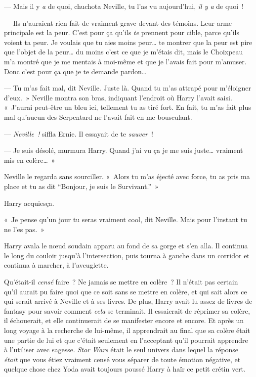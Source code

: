 --- Mais il y \emph{a} de quoi, chuchota Neville, tu l'as vu aujourd'hui, \emph{il y a} de quoi~!

--- Ils n'auraient rien fait de vraiment grave devant des témoins.
Leur arme principale est la peur.
C'est pour ça qu'ils \emph{te} prennent pour cible, parce qu'ils voient ta peur.
Je voulais que tu aies moins peur… te montrer que la peur est pire que l'objet de la peur… du moins c'est ce que je m'étais dit, mais le Choixpeau m'a montré que je me mentais à moi-même et que je l'avais fait pour m'amuser.
Donc c'est pour ça que je te demande pardon…

--- Tu m'as fait mal, dit Neville. Juste là.
Quand tu m'as attrapé pour m'éloigner d'eux.~»
Neville montra son bras, indiquant l'endroit où Harry l'avait saisi.
«~J'aurai peut-être un bleu ici, tellement tu as tiré fort.
En fait, tu m'as fait plus mal qu'aucun des Serpentard ne l'avait fait en me bousculant.

--- \emph{Neville~!} siffla Ernie. Il essayait de te \emph{sauver}~!

--- Je suis désolé, murmura Harry. Quand j'ai vu ça je me suis juste… vraiment mis en colère…~»

Neville le regarda sans sourciller.
«~Alors tu m'as éjecté avec force, tu as pris ma place et tu as dit “Bonjour, je suis le Survivant.”~»

Harry acquiesça.

«~Je pense qu'un jour tu seras vraiment cool, dit Neville. Mais pour l'instant tu ne l'es pas.~»

Harry avala le nœud soudain apparu au fond de sa gorge et s'en alla.
Il continua le long du couloir jusqu'à l'intersection, puis tourna à gauche dans un corridor et continua à marcher, à l'aveuglette.

Qu'était-il \emph{censé} faire~? Ne jamais se mettre en colère~?
Il n'était pas certain qu'il aurait pu faire quoi que ce soit sans se mettre en colère, et qui sait alors ce qui serait arrivé à Neville et à ses livres.
De plus, Harry avait lu assez de livres de fantasy pour savoir comment \emph{cela} se terminait.
Il essaierait de réprimer sa colère, il échouerait, et elle continuerait de se manifester encore et encore.
Et après un long voyage à la recherche de lui-même, il apprendrait au final que sa colère était une partie de lui et que c'était seulement en l'acceptant qu'il pourrait apprendre à l'utiliser avec sagesse.
\emph{Star Wars} était le seul univers dans lequel la réponse \emph{était} que vous étiez vraiment censé vous séparer de toute émotion négative, et quelque chose chez Yoda avait toujours poussé Harry à haïr ce petit crétin vert.

